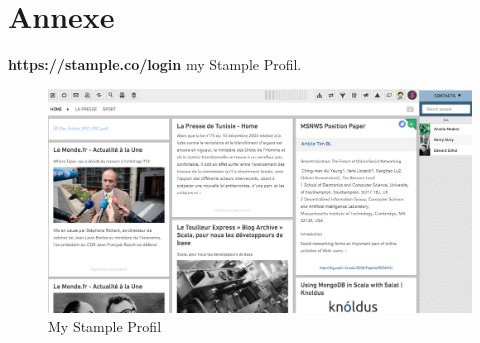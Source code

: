 \chapter{Annexe}

\textbf{https://stample.co/login} my Stample Profil.
\begin{figure}[H]
        \centering
                \centering
                \includegraphics[width=\textwidth]{Stample.png}
		\caption{My Stample Profil}

               
\end{figure}

